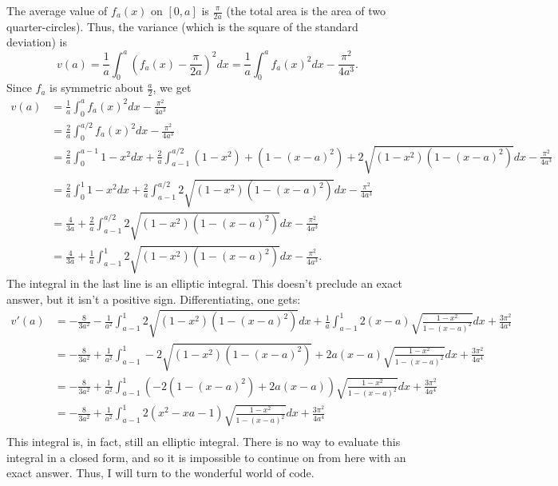\documentclass[11pt]{article}
\theoremstyle{definition}
\begin{document}
The average value of $f_a(x)$ on $[0, a]$ is $\frac{\pi}{2a}$ (the total area is the area of two quarter-circles).  Thus, the variance (which is the square of the standard deviation) is $$v(a) = \frac{1}{a} \int_{0}^a \left(f_a(x)-\frac{\pi}{2a}\right)^2dx = \frac{1}{a}\int_{0}^a f_a(x)^2dx - \frac{\pi^2}{4a^3}.$$  Since $f_a$ is symmetric about $\frac{a}{2}$, we get
\begin{align*}
v(a) & = \frac{1}{a} \int_{0}^a f_a(x)^2dx - \frac{\pi^2}{4a^3} \\
& = \frac{2}{a} \int_{0}^{a/2} f_a(x)^2dx - \frac{\pi^2}{4a^3}\\
& = \frac{2}{a} \int_{0}^{a-1} 1-x^2 dx + \frac{2}{a} \int_{a-1}^{a/2}(1-x^2) + (1-(x-a)^2) + 2\sqrt{(1-x^2)(1-(x-a)^2)}dx - \frac{\pi^2}{4a^3}\\
& = \frac{2}{a} \int_{0}^1 1-x^2 dx + \frac{2}{a} \int_{a-1}^{a/2}2\sqrt{(1-x^2)(1-(x-a)^2)}dx - \frac{\pi^2}{4a^3}\\
& = \frac{4}{3a} + \frac{2}{a} \int_{a-1}^{a/2}2\sqrt{(1-x^2)(1-(x-a)^2)}dx - \frac{\pi^2}{4a^3}\\
& = \frac{4}{3a} + \frac{1}{a} \int_{a-1}^{1}2\sqrt{(1-x^2)(1-(x-a)^2)}dx - \frac{\pi^2}{4a^3}.
\end{align*}
The integral in the last line is an elliptic integral.  This doesn't preclude an exact answer, but it isn't a positive sign.  Differentiating, one gets:
\begin{align*}
v'(a) & = -\frac{8}{3a^2} - \frac{1}{a^2}\int_{a-1}^{1}2\sqrt{(1-x^2)(1-(x-a)^2)}dx + \frac{1}{a}\int_{a-1}^{1}2(x-a)\sqrt{\frac{1-x^2}{1-(x-a)^2}}dx + \frac{3\pi^2}{4a^4} \\
& = -\frac{8}{3a^2} + \frac{1}{a^2}\int_{a-1}^{1}-2\sqrt{(1-x^2)(1-(x-a)^2)} + 2a(x-a)\sqrt{\frac{1-x^2}{1-(x-a)^2}}dx + \frac{3\pi^2}{4a^4} \\
& = -\frac{8}{3a^2} + \frac{1}{a^2}\int_{a-1}^{1}(-2(1-(x-a)^2) + 2a(x-a))\sqrt{\frac{1-x^2}{1-(x-a)^2}}dx + \frac{3\pi^2}{4a^4} \\
& = -\frac{8}{3a^2} + \frac{1}{a^2}\int_{a-1}^{1}2(x^2-xa-1)\sqrt{\frac{1-x^2}{1-(x-a)^2}}dx + \frac{3\pi^2}{4a^4} \\
\end{align*}
This integral is, in fact, still an elliptic integral.  There is no way to evaluate this integral in a closed form, and so it is impossible to continue on from here with an exact answer.  Thus, I will turn to the wonderful world of code.
\end{document}
